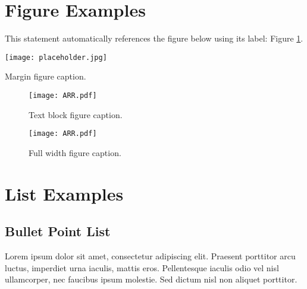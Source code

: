 \documentclass[
	a4paper, %
	12pt, %
]{CSSullivanBusinessReport}
\begin{document}
\section{Figure Examples}

This statement automatically references the figure below using its label: Figure \ref{fig:example}.


\begin{marginfigure} %
	\texttt{[image: placeholder.jpg]}
	\caption{Margin figure caption.}
\end{marginfigure}


\begin{figure}[H] %
	\texttt{[image: ARR.pdf]}
	\caption{Text block figure caption.}
	\label{fig:example} %
\end{figure}


\begin{figure*} %
	\texttt{[image: ARR.pdf]}
	\caption{Full width figure caption.}
\end{figure*}


\section{List Examples}

\subsection{Bullet Point List}

Lorem ipsum dolor sit amet, consectetur adipiscing elit. Praesent porttitor arcu luctus, imperdiet urna iaculis, mattis eros. Pellentesque iaculis odio vel nisl ullamcorper, nec faucibus ipsum molestie. Sed dictum nisl non aliquet porttitor.
\end{document}
